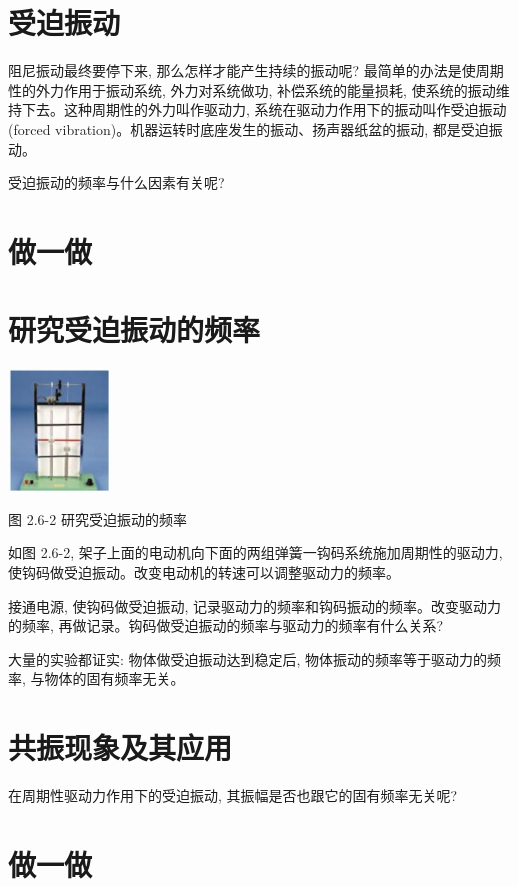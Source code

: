 \documentclass[10pt]{article}
\begin{document}
\section*{受迫振动}

阻尼振动最终要停下来, 那么怎样才能产生持续的振动呢? 最简单的办法是使周期性的外力作用于振动系统, 外力对系统做功, 补偿系统的能量损耗, 使系统的振动维持下去。这种周期性的外力叫作驱动力, 系统在驱动力作用下的振动叫作受迫振动 (forced vibration)。机器运转时底座发生的振动、扬声器纸盆的振动, 都是受迫振动。

受迫振动的频率与什么因素有关呢?

\section*{做一做}

\section*{研究受迫振动的频率}

\begin{center}
\includegraphics[max width=0.2\textwidth]{images/01910e4c-ebb8-7d2c-8f2f-2375bc1d2d12_60_389982.jpg}
\end{center}

图 2.6-2 研究受迫振动的频率

如图 2.6-2, 架子上面的电动机向下面的两组弹簧一钩码系统施加周期性的驱动力, 使钩码做受迫振动。改变电动机的转速可以调整驱动力的频率。

接通电源, 使钩码做受迫振动, 记录驱动力的频率和钩码振动的频率。改变驱动力的频率, 再做记录。钩码做受迫振动的频率与驱动力的频率有什么关系?

大量的实验都证实: 物体做受迫振动达到稳定后, 物体振动的频率等于驱动力的频率, 与物体的固有频率无关。

\section*{共振现象及其应用}

在周期性驱动力作用下的受迫振动, 其振幅是否也跟它的固有频率无关呢?

\section*{做一做}
\end{document}
